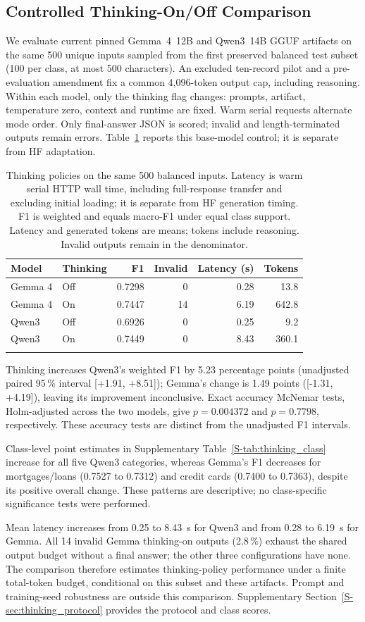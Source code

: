 \subsection{Controlled Thinking-On/Off Comparison}
\label{sec:thinking_control}
We evaluate current pinned Gemma~4~12B and Qwen3~14B GGUF artifacts
on the same 500 unique inputs sampled from the first preserved balanced
test subset (100 per class, at most 500 characters). An excluded
ten-record pilot and a pre-evaluation
amendment fix a common 4,096-token output cap, including reasoning.
Within each model, only the thinking flag changes: prompts, artifact,
temperature zero, context and runtime are fixed. Warm serial requests
alternate mode order. Only final-answer JSON is scored; invalid and
length-terminated outputs remain errors. Table~\ref{tab:thinking_control}
reports this base-model control; it is separate from HF adaptation.
\begin{table}[tb]\centering\small
\caption{Thinking policies on the same 500 balanced inputs. Latency
is warm serial HTTP wall time, including full-response transfer and
excluding initial loading; it is separate from HF generation timing.
F1 is weighted and equals macro-F1 under equal class support.
Latency and generated tokens are means; tokens include reasoning.
Invalid outputs remain in the denominator.}
\label{tab:thinking_control}
\begin{tabular}{llrrrr}\toprule
Model & Thinking & F1 & Invalid & Latency (s) & Tokens \\\midrule
Gemma 4 & Off & 0.7298 & 0 & 0.28 & 13.8 \\
Gemma 4 & On & 0.7447 & 14 & 6.19 & 642.8 \\
Qwen3 & Off & 0.6926 & 0 & 0.25 & 9.2 \\
Qwen3 & On & 0.7449 & 0 & 8.43 & 360.1 \\
\botrule\end{tabular}\end{table}
Thinking increases Qwen3's weighted F1 by 5.23 percentage points
(unadjusted paired 95\,\% interval [+1.91, +8.51]); Gemma's change is
1.49 points ([-1.31, +4.19]), leaving its improvement inconclusive.
Exact accuracy McNemar tests, Holm-adjusted across the two models,
give $p=0.004372$ and $p=0.7798$, respectively. These accuracy tests
are distinct from the unadjusted F1 intervals.

Class-level point estimates in Supplementary
Table~\ref{S-tab:thinking_class} increase for all five Qwen3 categories,
whereas Gemma's F1 decreases for mortgages/loans (0.7527 to 0.7312)
and credit cards (0.7400 to 0.7363), despite its positive overall
change. These patterns are descriptive; no class-specific significance
tests were performed.

Mean latency increases from 0.25 to 8.43~s for Qwen3 and from 0.28
to 6.19~s for Gemma. All 14 invalid Gemma thinking-on outputs
(2.8\,\%) exhaust the shared output budget without a final answer;
the other three configurations have none. The comparison therefore
estimates thinking-policy performance under a finite total-token
budget, conditional on this subset and these artifacts. Prompt and
training-seed robustness are outside this comparison. Supplementary Section~\ref{S-sec:thinking_protocol}
provides the protocol and class scores.
